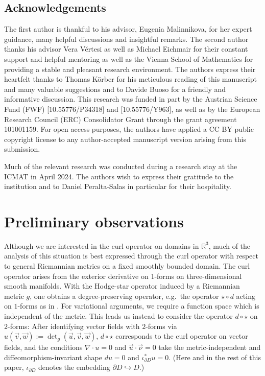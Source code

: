 \documentclass[11pt,reqno]{amsart}
\begin{document}
\subsection{Acknowledgements}
The first author is thankful to his advisor, Eugenia Malinnikova, for her expert guidance, many helpful discussions and insightful remarks. The second author thanks his advisor Vera V\'ertesi as well as Michael Eichmair for their constant support and helpful mentoring as well as the Vienna School of Mathematics for providing a stable and pleasant research environment. The authors express their heartfelt thanks to Thomas Körber for his meticulous reading of this manuscript and many valuable suggestions and to Davide Buoso for a friendly and informative discussion. This research was funded in part by the Austrian Science Fund (FWF) [10.55776/P34318] and [10.55776/Y963], as well as by the European Research Council (ERC) Consolidator Grant through the grant agreement 101001159. For open access purposes, the authors have applied a CC BY public copyright license to any author-accepted manuscript version arising from this submission.

Much of the relevant research was conducted during a research stay at the ICMAT in April 2024. The authors wish to express their gratitude to the institution and to Daniel Peralta-Salas in particular for their hospitality.

\section{Preliminary observations}\label{section: preliminary observations}

Although we are interested in the curl operator on domains in $\mathbb R^3$, much of the analysis of this situation is best expressed through the curl operator with respect to general Riemannian metrics on a fixed smoothly bounded domain. The curl operator arises from the exterior derivative on $1$-forms on three-dimensional smooth manifolds. With the Hodge-star operator induced by a Riemannian metric $g$, one obtains a degree-preserving operator, e.g.\ the operator $\star \circ d$ acting on $1$-forms as in \cite{HiptmairKotiugaTordeux2012}.
For variational arguments, we require a function space which is independent of the metric. This leads us instead to consider the operator $d \circ \star$ on $2$-forms: After identifying vector fields with $2$-forms via $u(\vec v,\vec w) := \det_g(\vec u, \vec v, \vec w)$, $d\circ \star$ corresponds to the curl operator on vector fields, and the conditions $\nabla \cdot u = 0$ and $\vec u \cdot \vec \nu = 0$ take the metric-independent and diffeomorphism-invariant shape $du = 0$ and $\iota_{\partial D}^\ast u = 0$. (Here and in the rest of this paper, $\iota_{\partial D}$ denotes the embedding $\partial D \hookrightarrow D$.)
\end{document}

